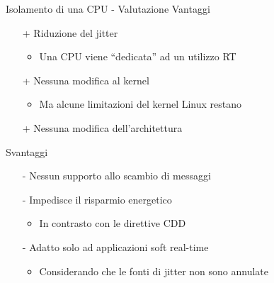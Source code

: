 \begin{frame}{Isolamento di una CPU - Valutazione}
	Vantaggi
	\begin{itemize}
		\item[+] Riduzione del jitter
		\begin{itemize}
			\item Una CPU viene ``dedicata'' ad un utilizzo RT
		\end{itemize}
		\item[+] Nessuna modifica al kernel
		\begin{itemize}
			\item Ma alcune limitazioni del kernel Linux restano
		\end{itemize}
		\item[+] Nessuna modifica dell'architettura
	\end{itemize}
	\vspace{10px}
	Svantaggi
	\begin{itemize}
		\item[-] Nessun supporto allo scambio di messaggi
		\item[-] Impedisce il risparmio energetico
		\begin{itemize}
			\item In contrasto con le direttive CDD
		\end{itemize}
		\item[-] Adatto solo ad applicazioni soft real-time
		\begin{itemize}
			\item Considerando che le fonti di jitter non sono annulate
		\end{itemize}
	\end{itemize}
\end{frame}